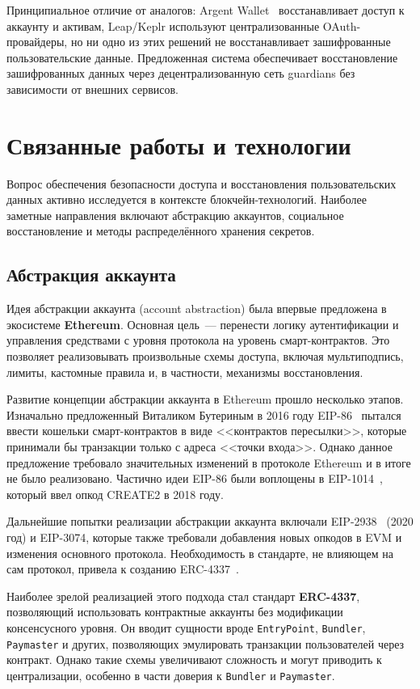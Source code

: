 \documentclass[12pt]{a&t}
\begin{document}
Принципиальное отличие от аналогов: Argent Wallet~\cite{argent} восстанавливает доступ к аккаунту и активам, Leap/Keplr используют централизованные OAuth-провайдеры, но ни одно из этих решений не восстанавливает зашифрованные пользовательские данные. Предложенная система обеспечивает восстановление зашифрованных данных через децентрализованную сеть guardians без зависимости от внешних сервисов.


\section{Связанные работы и технологии}

Вопрос обеспечения безопасности доступа и восстановления пользовательских данных активно исследуется в контексте блокчейн-технологий. Наиболее заметные направления включают абстракцию аккаунтов, социальное восстановление и методы распределённого хранения секретов.

\subsection{Абстракция аккаунта}

Идея абстракции аккаунта (account abstraction) была впервые предложена в экосистеме \textbf{Ethereum}. Основная цель~--- перенести логику аутентификации и управления средствами с уровня протокола на уровень смарт-контрактов. Это позволяет реализовывать произвольные схемы доступа, включая мультиподпись, лимиты, кастомные правила и, в частности, механизмы восстановления.

Развитие концепции абстракции аккаунта в Ethereum прошло несколько этапов. Изначально предложенный Виталиком Бутериным в 2016 году EIP-86~\cite{eip86} пытался ввести кошельки смарт-контрактов в виде <<контрактов пересылки>>, которые принимали бы транзакции только с адреса <<точки входа>>. Однако данное предложение требовало значительных изменений в протоколе Ethereum и в итоге не было реализовано. Частично идеи EIP-86 были воплощены в EIP-1014~\cite{eip1014}, который ввел опкод CREATE2 в 2018 году.

Дальнейшие попытки реализации абстракции аккаунта включали EIP-2938~\cite{eip2938} (2020 год) и EIP-3074, которые также требовали добавления новых опкодов в EVM и изменения основного протокола. Необходимость в стандарте, не влияющем на сам протокол, привела к созданию ERC-4337~\cite{erc4337}.

Наиболее зрелой реализацией этого подхода стал стандарт \textbf{ERC-4337}, позволяющий использовать контрактные аккаунты без модификации консенсусного уровня. Он вводит сущности вроде \texttt{EntryPoint}, \texttt{Bundler}, \texttt{Paymaster} и других, позволяющих эмулировать транзакции пользователей через контракт. Однако такие схемы увеличивают сложность и могут приводить к централизации, особенно в части доверия к \texttt{Bundler} и \texttt{Paymaster}.
\end{document}
